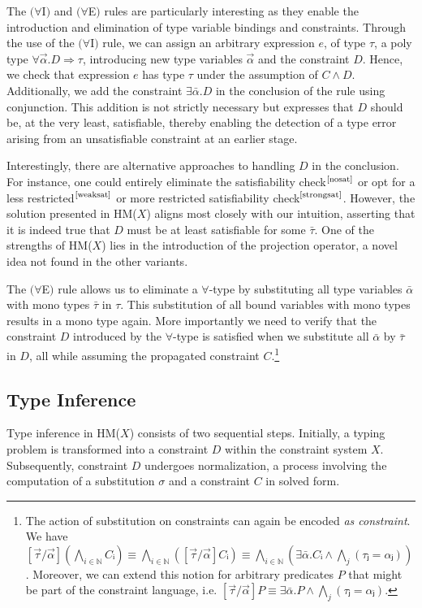\documentclass[runningheads]{llncs}
\newcommand{\hmx}{HM($X$)}
\begin{document}
The $(∀$I$)$ and $(∀$E$)$ rules are particularly interesting as they
enable the introduction and elimination of type variable bindings and
constraints.
Through the use of the $(∀$I$)$ rule, we can assign an arbitrary
expression $e$, of type $τ$, a poly type $∀ \Vec α.D ⇒ τ$,
introducing new type variables $\Vec α$ and the constraint $D$.
Hence, we check that expression $e$ has type $τ$ under the assumption of
$C ∧ D$.
Additionally, we add the constraint $∃\bar{α}. D$ in the conclusion of
the rule using conjunction.
This addition is not strictly necessary but expresses that $D$ should be,
at the very least, satisfiable, thereby enabling the detection of a type
error arising from an unsatisfiable constraint at an earlier stage.

Interestingly, there are alternative approaches to handling $D$ in the
conclusion. For instance, one could entirely eliminate the satisfiability
check$^\text{\cite{nosat}}$ or opt for a less
restricted$^\text{\cite{weaksat}}$ or more restricted satisfiability
check$^\text{\cite{strongsat}}$. However, the solution presented in \hmx{}
aligns most closely with our intuition, asserting that it is indeed true that
$D$ must be at least satisfiable for some $\bar τ$. One of the strengths of
\hmx{} lies in the introduction of the projection operator, a novel idea not
found in the other variants.

The $(∀$E$)$ rule allows us to eliminate a $∀$-type by substituting all
type variables $\bar{α}$ with mono types $\bar{τ}$ in $τ$. This substitution
of all bound variables with mono types results in a mono type again. More
importantly we need to verify that the constraint $D$ introduced by the
$∀$-type is satisfied when we substitute all $\bar{α}$ by $\bar{τ}$ in $D$, all
while assuming the propagated constraint $C$.\footnote{
The action of substitution on constraints can again be encoded
\emph{as constraint}.
We have $[\Vec τ / \Vec α] (⋀_{i ∈ ℕ} Cᵢ) ≡ ⋀_{i ∈ ℕ} ([\Vec τ / \Vec
      α]Cᵢ) ≡
  ⋀_{i ∈ ℕ} (∃\bar{α}. Cᵢ ∧ ⋀_{j}(τⱼ = αⱼ))$.
Moreover, we can extend this notion for arbitrary predicates $P$ that might be
part of the constraint language, i.e. $[\Vec τ / \Vec α]P ≡ ∃\bar{α}. P ∧
  ⋀_{j}(τⱼ = αⱼ)$.
}

\subsection{Type Inference}
Type inference in \hmx{} consists of two sequential steps. Initially, a
typing
problem is transformed into a constraint $D$ within the constraint system
$X$.
Subsequently, constraint $D$ undergoes normalization, a process involving
the
computation of a substitution $σ$ and a constraint $C$ in solved form.
\end{document}
